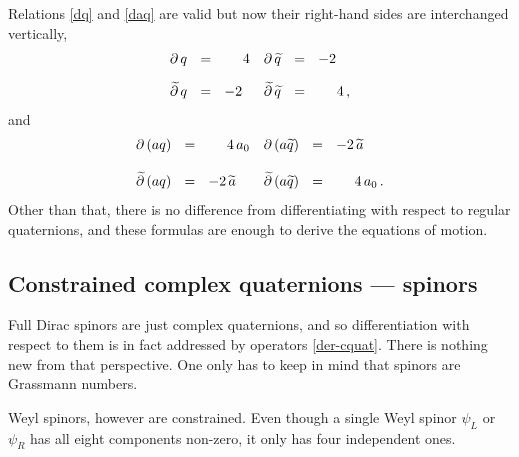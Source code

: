 \documentclass[epsfig,12pt]{article}
\newcommand{\p}{\partial}
\newcommand{\wt}{\widetilde}
\begin{document}
	Relations \eqref{dq} and \eqref{daq} are valid but now their right-hand sides are interchanged vertically,
\begin{align}
%
\notag
	\p\,q		& ~~=~~		~~~~4		& \p\,\wt q	& ~~=~~		-2\\[2mm]
%
\label{dq-vector}
	\wt\p\,q	& ~~=~~		-2		& \wt\p\,\wt q	& ~~=~~		~~~~4\,,
\end{align}
	and
\begin{align}
%
\notag
	\p\,(a q)	& ~~=~~		~~~~4\,a_0	& \p\,(a \wt q)		& ~~=~~		-2\,\wt a\\[3mm]
%
\label{daq-vector}
	\wt\p\, (a q)	& ~~=~~		-2\,\wt a	& \wt\p\, (a \wt q)	& ~~=~~		~~~~4\,a_0\,.
\end{align}
	Other than that, there is no difference from differentiating with respect to regular quaternions,
	and these formulas are enough to derive the equations of motion.


\subsection{Constrained complex quaternions --- spinors}

	Full Dirac spinors are just complex quaternions, and so differentiation
	with respect to them is in fact addressed by operators \eqref{der-cquat}.
	There is nothing new from that perspective.
	One only has to keep in mind that spinors are Grassmann numbers.

	Weyl spinors, however are constrained.
	Even though a single Weyl spinor $ \psi_L $ or $ \psi_R $ has all eight
	components non-zero, it only has four independent ones.
\end{document}
